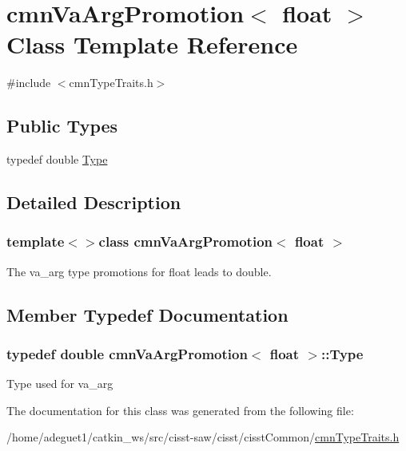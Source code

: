 \hypertarget{classcmn_va_arg_promotion_3_01float_01_4}{\section{cmn\-Va\-Arg\-Promotion$<$ float $>$ Class Template Reference}
\label{classcmn_va_arg_promotion_3_01float_01_4}
}


{\ttfamily \#include $<$cmn\-Type\-Traits.\-h$>$}

\subsection*{Public Types}
\begin{DoxyCompactItemize}
\item 
typedef double \hyperlink{classcmn_va_arg_promotion_3_01float_01_4_aad7fc5d5fe18edf744594e8f7bef887c}{Type}
\end{DoxyCompactItemize}


\subsection{Detailed Description}
\subsubsection*{template$<$$>$class cmn\-Va\-Arg\-Promotion$<$ float $>$}

The va\-\_\-arg type promotions for float leads to double. 

\subsection{Member Typedef Documentation}
\hypertarget{classcmn_va_arg_promotion_3_01float_01_4_aad7fc5d5fe18edf744594e8f7bef887c}{
\subsubsection[{Type}]{\setlength{\rightskip}{0pt plus 5cm}typedef double {\bf cmn\-Va\-Arg\-Promotion}$<$ float $>$\-::{\bf Type}}}\label{classcmn_va_arg_promotion_3_01float_01_4_aad7fc5d5fe18edf744594e8f7bef887c}
Type used for va\-\_\-arg 

The documentation for this class was generated from the following file\-:\begin{DoxyCompactItemize}
\item 
/home/adeguet1/catkin\-\_\-ws/src/cisst-\/saw/cisst/cisst\-Common/\hyperlink{cmn_type_traits_8h}{cmn\-Type\-Traits.\-h}\end{DoxyCompactItemize}
